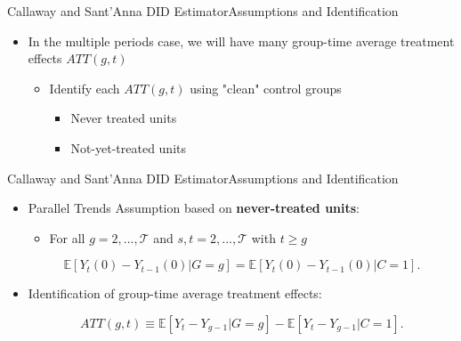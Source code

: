 \documentclass[dvipsnames,hyperref={pdfpagelabels=false}]{beamer}
\begin{document}
\begin{frame}{Callaway and Sant'Anna DID Estimator}{Assumptions and Identification}
	\begin{itemize}
		
		\item  In the multiple periods case, we will have many group-time average treatment effects $ATT (g,t)$
				\vspace{0.2cm}
			\begin{itemize}
		\item Identify each $ATT (g,t)$ using "clean" control groups
						\vspace{0.2cm}
		\begin{itemize}
			\item Never treated units 
			\vspace{0.2cm}
			\item Not-yet-treated units
		\end{itemize}
		
			\end{itemize}
		
	
		
		
	\end{itemize}
	
	
\end{frame}




\begin{frame}{Callaway and Sant'Anna DID Estimator}{Assumptions and Identification}
	\begin{itemize}
		
		\item  Parallel Trends Assumption based on \textbf{never-treated units}:
		\vspace{0.2cm}
			\begin{itemize}
		\item For all $g=2,...,\mathcal{T}$ and $s,t=2,...,\mathcal{T}$ with $t \ge g$
			\end{itemize}
				\vspace{0.2cm}
		
		\begin{equation*}
			\mathbb{E}\left[Y_{t}(0)-Y_{t-1}(0) | G=g \right] = 	\mathbb{E}\left[Y_{t}(0)-Y_{t-1}(0) | C=1 \right].
		\end{equation*}
									\vspace{0.2cm}
		
		\item  Identification of group-time average treatment effects:
		
		\begin{equation*}
			ATT (g,t) \equiv	\mathbb{E}\left[Y_{t}-Y_{g-1} | G=g \right] - 	\mathbb{E}\left[Y_{t}-Y_{g-1} |C=1 \right].
		\end{equation*}
		
		
	\end{itemize}
	
	
\end{frame}
\end{document}

